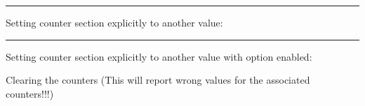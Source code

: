 \documentclass[a4paper,12pt]{book}%
\newcounter{associatedpages}%
\newcounter{anotherpagescounter}%
\begin{document}


\hrule\par

Setting counter section explicitly to another value: 

\setcounter{section}{12}%

\hrule\par

Setting counter section explicitly to another value with option enabled: 

\setcounter[AssociatedCounters={associatedpages,anotherpagescounter,gandalf}]{page}{20}%



%

%

%

%
%



Clearing the counters (This will report wrong values for the associated counters!!!)
\end{document}
